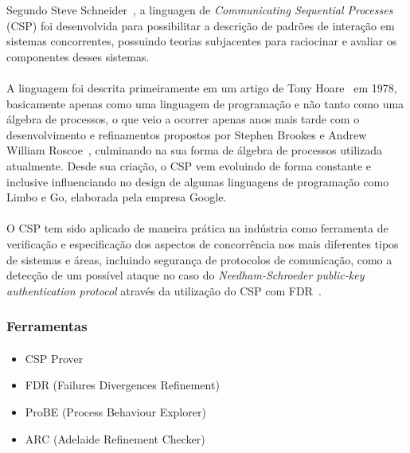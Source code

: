 Segundo Steve Schneider~\cite{Schneider:1999:CRT:555233}, a linguagen de \textit{Communicating Sequential Processes}
(CSP) foi desenvolvida para possibilitar a descrição de padrões de interação em sistemas concorrentes,
possuindo teorias subjacentes para raciocinar e avaliar os componentes desses sistemas.
\paragraph{}
A linguagem foi descrita primeiramente em um artigo de Tony Hoare~\cite{Hoare:1978:CSP:359576.359585} em 1978,
basicamente apenas como uma linguagem de programação e não tanto como uma álgebra de processos, o que veio a ocorrer
apenas anos mais tarde com o desenvolvimento e refinamentos propostos por Stephen Brookes e Andrew William Roscoe~\cite{Brookes:1984:TCS:828.833},
culminando na sua forma de álgebra de processos utilizada atualmente.
Desde sua criação, o CSP vem evoluindo de forma constante e inclusive influenciando no design de algumas linguagens
de programação como Limbo e Go, elaborada pela empresa Google.
\paragraph{}
O CSP tem sido aplicado de maneira prática na indústria como ferramenta de verificação e especificação dos aspectos
de concorrência nos mais diferentes tipos de sistemas e áreas, incluindo segurança de protocolos de comunicação,
como a detecção de um possível ataque no caso do \textit{Needham-Schroeder public-key authentication protocol}
através da utilização do CSP com FDR~\cite{Lowe:1996:BFN:646480.693776}.

\subsubsection{Ferramentas}
\paragraph{}
\begin{itemize}
\item{CSP Prover}
\item{FDR (Failures Divergences Refinement)}
\item{ProBE (Process Behaviour Explorer)}
\item{ARC (Adelaide Refinement Checker)}
\end{itemize}
